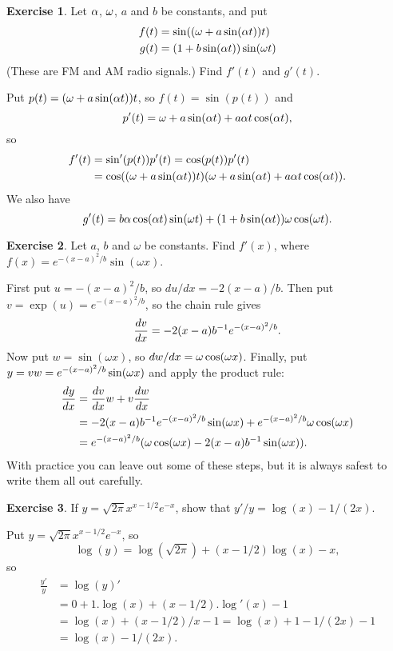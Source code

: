 \documentclass[a4paper]{amsart}
\theoremstyle{definition}
\newtheorem{exercise}{Exercise}[section]
\newenvironment{solution}{{\noindent \bf Solution:}}{}
\begin{document}
\begin{exercise}\label{ex-fm-signal}
Let $\al$, $\om$, $a$ and $b$ be constants, and put
 \begin{align*}
  f(t) &= \sin((\om+a\sin(\al t))t) \\
  g(t) &= (1+b\sin(\al t))\sin(\om t)
 \end{align*}
 (These are FM and AM radio signals.)  Find $f'(t)$ and $g'(t)$.
\end{exercise}
\begin{solution}
Put $p(t)=(\om+a\sin(\al t))t$, so $f(t)=\sin(p(t))$ and 
 \[ p'(t) = \om + a\sin(\al t) + a\al t\cos(\al t), \] 
 so
 \begin{align*}
  f'(t) &= \sin'(p(t)) p'(t) = \cos(p(t)) p'(t) \\
        &= \cos((\om+a\sin(\al t))t)
            (\om + a\sin(\al t) + a\al t\cos(\al t)).
 \end{align*}
 We also have
 \[ g'(t) = b\al\cos(\al t)\sin(\om t) + 
            (1+b\sin(\al t))\om \cos(\om t). 
 \]
\end{solution}
\begin{exercise}\label{ex-diff-packet}
Let $a$, $b$ and $\omega$ be constants.  Find $f'(x)$, where
  $f(x)=e^{-(x-a)^2/b}\sin(\omega x)$. 
\end{exercise}
\begin{solution}
  First put $u=-(x-a)^2/b$, so $du/dx=-2(x-a)/b$.  Then put
  $v=\exp(u)=e^{-(x-a)^2/b}$, so the chain rule gives
  \[ \frac{dv}{dx} = -2(x-a)b^{-1}e^{-(x-a)^2/b}. \mks{2} \]
  Now put $w=\sin(\omega x)$, so $dw/dx=\om\cos(\om x)$.  
  Finally, put $y=vw=e^{-(x-a)^2/b}\sin(\om x)$ and apply the product
  rule: 
  \begin{align*}
   \frac{dy}{dx} &= \frac{dv}{dx}w + v\frac{dw}{dx} \\
   &= -2(x-a)b^{-1}e^{-(x-a)^2/b} \sin(\om x) + 
      e^{-(x-a)^2/b} \om\cos(\om x) \\
   &= e^{-(x-a)^2/b}(\om\cos(\om x) - 2(x-a)b^{-1}\sin(\om x)) \mks{2}.
  \end{align*}
  With practice you can leave out some of these steps, but it is
  always safest to write them all out carefully.
\end{solution}
\begin{exercise}\label{ex-diff-stirling}
If $y=\sqrt{2\pi}x^{x-1/2}e^{-x}$, show that $y'/y=\log(x)-1/(2x)$.
\end{exercise}
\begin{solution}
  Put $y=\sqrt{2\pi}x^{x-1/2}e^{-x}$, so 
  \[ \log(y) = \log(\sqrt{2\pi}) + (x-1/2)\log(x) - x, \]
  so
  \begin{align*}
   \frac{y'}{y} &= \log(y)' \\
    &= 0 + 1.\log(x) + (x-1/2).\log'(x) - 1 \\
    &= \log(x) + (x-1/2)/x - 1 = \log(x) + 1 - 1/(2x) - 1 \\
    &= \log(x) - 1/(2x).  
  \end{align*}
\end{solution}
\end{document}
